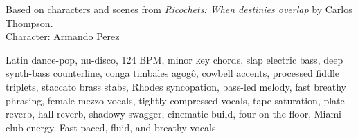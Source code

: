 
\begin{notes}
Based on characters and scenes from \emph{Ricochets: When destinies overlap} by Carlos Thompson.\\
Character: Armando Perez
\end{notes}
\begin{style}
Latin dance-pop, nu-disco, 124 BPM, minor key chords, slap electric bass, deep synth-bass counterline, conga timbales agogô, cowbell accents, processed fiddle triplets, staccato brass stabs, Rhodes syncopation, bass-led melody, fast breathy phrasing, female mezzo vocals, tightly compressed vocals, tape saturation, plate reverb, hall reverb, shadowy swagger, cinematic build, four-on-the-floor, Miami club energy, Fast-paced, fluid, and breathy vocals
\end{style}
